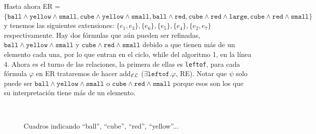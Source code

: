 Hasta ahora ER = $\{\texttt{ball} \wedge \texttt{yellow} \wedge \texttt{small}, \texttt{cube} \wedge \texttt{yellow} \wedge \texttt{small}, \texttt{ball} \wedge \texttt{red}, \texttt{cube} \wedge \texttt{red} \wedge \texttt{large}, \texttt{cube} \wedge \texttt{red} \wedge \texttt{small}\}$ 
y tenemos las siguientes extensiones: $\{e_1, e_3\}, \{e_6\}, \{e_5\}, \{e_4\}, \{e_2, e_7\}$ respectivamente. 
Hay dos f\'ormulas que a\'un pueden ser refinadas, $\texttt{ball} \wedge \texttt{yellow} \wedge \texttt{small}$ y $\texttt{cube} \wedge \texttt{red} \wedge \texttt{small}$ 
debido a que tienen m\'as de un elemento cada una, por lo que entran en el ciclo, while del algoritmo 1, en la l\'inea 4. Ahora es el turno de las relaciones, la primera de ellas es \texttt{leftof}, para cada f\'ormula $\varphi$ en ER trataremos de hacer add$_\mathcal{EL}$ ($\exists \texttt{leftof}.\varphi$, RE). Notar que $\psi$ solo puede ser $\texttt{ball} \wedge \texttt{yellow} \wedge \texttt{small}$ o $\texttt{cube} \wedge \texttt{red} \wedge \texttt{small}$ porque esos son los que su interpretaci\'on tiene m\'as de un elemento. 


\begin{figure}[ht]
\begin{center}
\\[0pt]
\caption{Cuadros indicando ``ball'', ``cube'', ``red'', ``yellow''...}
\label{fig-modelo15}
\end{center}
\end{figure}



